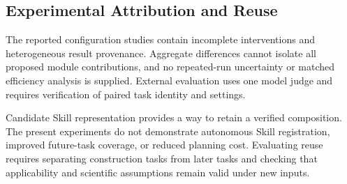 \subsection{Experimental Attribution and Reuse}
The reported configuration studies contain incomplete interventions and heterogeneous result provenance. Aggregate differences cannot isolate all proposed module contributions, and no repeated-run uncertainty or matched efficiency analysis is supplied. External evaluation uses one model judge and requires verification of paired task identity and settings.

Candidate Skill representation provides a way to retain a verified composition. The present experiments do not demonstrate autonomous Skill registration, improved future-task coverage, or reduced planning cost. Evaluating reuse requires separating construction tasks from later tasks and checking that applicability and scientific assumptions remain valid under new inputs.
